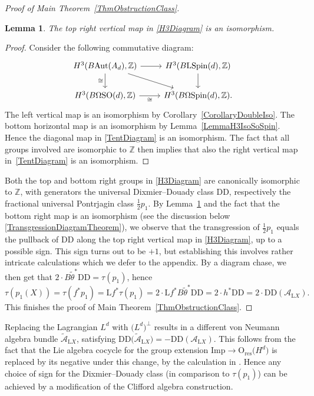 \documentclass[pdftex]{sigma}
\numberwithin{equation}{section}
\newtheorem{Lemma}[Theorem]{Lemma}
\newcommand{\Z}{\mathbb{Z}}
\newcommand{\A}{\mathcal{A}}
\newcommand{\SO}{\mathrm{SO}}
\newcommand{\res}{\mathrm{res}}
\newcommand{\Aut}{\mathrm{Aut}}
\newcommand{\Spin}{\mathrm{Spin}}
\newcommand{\Imp}{\mathrm{Imp}}
\renewcommand{\O}{\mathrm{O}}
\renewcommand{\L}{\mathrm{L}}
\newcommand{\DD}{\mathrm{DD}}
\begin{document}
\begin{proof}[Proof of Main Theorem~\ref{ThmObstructionClass}]
\begin{Lemma} \label{LemmaIsomorphismTopRightH3}
The top right vertical map in \eqref{H3Diagram} is an isomorphism.
\end{Lemma}

\begin{proof}
Consider the following commutative diagram:
\begin{equation} \label{TentDiagram}
\begin{tikzcd}
H^3(B \Aut(A_d), \Z) \ar[d, "\cong"'] \ar[r] \ar[dr]
&
H^3(B\L\Spin(d), \Z)
\ar[d]
 \\
H^3(B\Omega\SO(d), \Z) \ar[r, "\cong"'] & H^3(B\Omega\Spin(d), \Z).
\end{tikzcd}
\end{equation}
The left vertical map is an isomorphism by Corollary~\ref{CorollaryDoubleIso}.
The bottom horizontal map is an isomorphism by Lemma~\ref{LemmaH3IsoSoSpin}.
Hence the diagonal map in \eqref{TentDiagram} is an isomorphism.
The fact that all groups involved are isomorphic to $\Z$ then implies that also the right vertical map in~\eqref{TentDiagram} is an isomorphism.
\end{proof}

Both the top and bottom right groups in \eqref{H3Diagram} are canonically isomorphic to $\Z$, with generators the universal Dixmier--Douady class $\DD$, respectively the fractional universal Pontrjagin class $\frac{1}{2}p_1$.
By Lemma~\ref{LemmaIsomorphismTopRightH3} and the fact that the bottom right map is an isomorphism (see the discussion below \eqref{TransgressionDiagramTheorem}), we observe that the transgression of $\frac{1}{2}p_1$ equals the pullback of $\DD$ along the top right vertical map in \eqref{H3Diagram}, up to a possible sign.
This sign turns out to be $+1$, but establishing this involves rather intricate calculations which we defer to the appendix.
By a diagram chase, we then get that $2\cdot B\tilde{\theta}^* \DD = \tau(p_1)$, hence
\begin{equation*}
 \tau(p_1(X)) = \tau(f^* p_1) = \L f^* \tau(p_1) = 2\cdot \L f^* B\tilde{\theta}^* \DD = 2 \cdot h^* \DD = 2\cdot\DD(\A_{\L X}).
\end{equation*}
This finishes the proof of Main Theorem~\ref{ThmObstructionClass}.
\end{proof}

\begin{Remark} \label{RemarkSign}
Replacing the Lagrangian $L^d$ with $\big(L^d\big)^\perp$ results in a different von Neumann algebra bundle $\tilde{\mathcal{A}}_{\L X}$, satisfying $\DD\big(\tilde{\mathcal{A}}_{\L X}\big) = -\DD(\mathcal{A}_{\L X})$.
This follows from the fact that the Lie algebra cocycle for the group extension $\Imp \to \O_{\res}\big(H^d\big)$ is replaced by its negative under this change, by the calculation in \cite[Theorem~6.10]{Araki1}.
Hence any choice of sign for the Dixmier--Douady class (in comparison to $\tau(p_1)$) can be achieved by a modification of the Clifford algebra construction.
\end{Remark}
\end{document}
